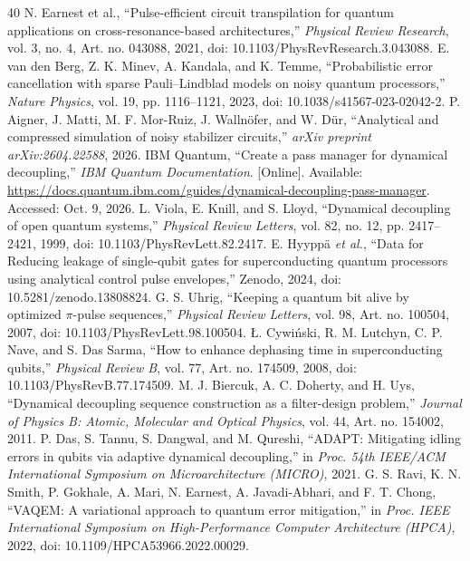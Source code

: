 \documentclass[10pt,letterpaper,journal]{IEEEtran}
\begin{document}
\begin{thebibliography}{40}
 N. Earnest et al., ``Pulse-efficient circuit transpilation for quantum applications on cross-resonance-based architectures,'' \emph{Physical Review Research}, vol. 3, no. 4, Art. no. 043088, 2021, doi: 10.1103/PhysRevResearch.3.043088.
 E. van den Berg, Z. K. Minev, A. Kandala, and K. Temme, ``Probabilistic error cancellation with sparse Pauli--Lindblad models on noisy quantum processors,'' \emph{Nature Physics}, vol. 19, pp. 1116--1121, 2023, doi: 10.1038/s41567-023-02042-2.
 P. Aigner, J. Matti, M. F. Mor-Ruiz, J. Walln\"ofer, and W. D\"ur, ``Analytical and compressed simulation of noisy stabilizer circuits,'' \emph{arXiv preprint arXiv:2604.22588}, 2026.
 IBM Quantum, ``Create a pass manager for dynamical decoupling,'' \emph{IBM Quantum Documentation}. [Online]. Available: \url{https://docs.quantum.ibm.com/guides/dynamical-decoupling-pass-manager}. Accessed: Oct. 9, 2026.
 L. Viola, E. Knill, and S. Lloyd, ``Dynamical decoupling of open quantum systems,'' \emph{Physical Review Letters}, vol. 82, no. 12, pp. 2417--2421, 1999, doi: 10.1103/PhysRevLett.82.2417.
 E. Hyypp\"a \emph{et al.}, ``Data for Reducing leakage of single-qubit gates for superconducting quantum processors using analytical control pulse envelopes,'' Zenodo, 2024, doi: 10.5281/zenodo.13808824.
 G. S. Uhrig, ``Keeping a quantum bit alive by optimized $\pi$-pulse sequences,'' \emph{Physical Review Letters}, vol. 98, Art. no. 100504, 2007, doi: 10.1103/PhysRevLett.98.100504.
 {\L}. Cywi\'nski, R. M. Lutchyn, C. P. Nave, and S. Das Sarma, ``How to enhance dephasing time in superconducting qubits,'' \emph{Physical Review B}, vol. 77, Art. no. 174509, 2008, doi: 10.1103/PhysRevB.77.174509.
 M. J. Biercuk, A. C. Doherty, and H. Uys, ``Dynamical decoupling sequence construction as a filter-design problem,'' \emph{Journal of Physics B: Atomic, Molecular and Optical Physics}, vol. 44, Art. no. 154002, 2011.
 P. Das, S. Tannu, S. Dangwal, and M. Qureshi, ``ADAPT: Mitigating idling errors in qubits via adaptive dynamical decoupling,'' in \emph{Proc. 54th IEEE/ACM International Symposium on Microarchitecture (MICRO)}, 2021.
 G. S. Ravi, K. N. Smith, P. Gokhale, A. Mari, N. Earnest, A. Javadi-Abhari, and F. T. Chong, ``VAQEM: A variational approach to quantum error mitigation,'' in \emph{Proc. IEEE International Symposium on High-Performance Computer Architecture (HPCA)}, 2022, doi: 10.1109/HPCA53966.2022.00029.

\end{thebibliography}
\end{document}
